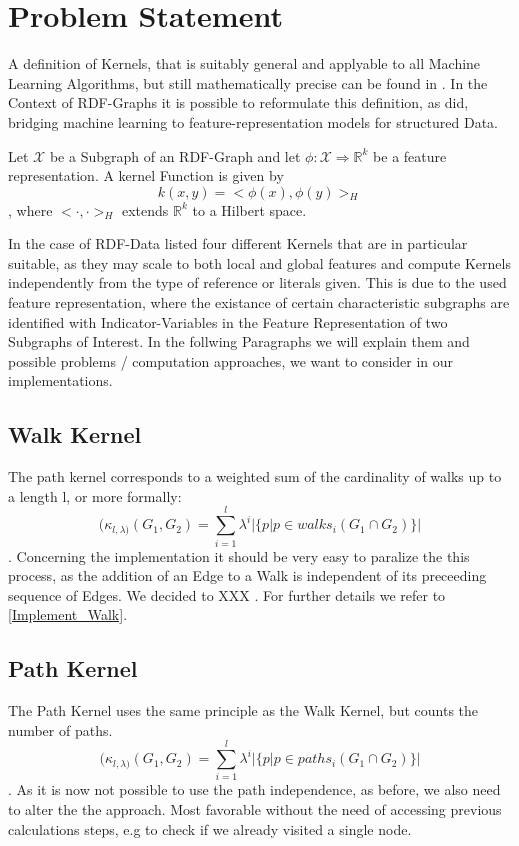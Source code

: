 
\section{Problem Statement}
A definition of Kernels, that is suitably general and applyable to all Machine Learning Algorithms, but still mathematically precise can be found in \citep{shawe}. In the Context of RDF-Graphs it is possible to reformulate this definition, as \citet{mainsource} did, bridging machine learning to feature-representation models for structured Data. 

\begin{Definition}
Let $\mathscr{X}$ be a Subgraph of an RDF-Graph and let $\phi: \mathscr{X} \Rightarrow \mathbb{R}^k$ be a feature representation. A kernel Function is given by \[k(x,y) = <\phi(x),\phi(y)>_H\], where $<\cdot,\cdot>_H $  extends $\mathbb{R}^k$ to a Hilbert space.
\end{Definition}

In the case of RDF-Data \citet{mainsource} listed four different Kernels that are in particular suitable, as they may scale to both local and global features and compute Kernels independently from the type of reference or literals given. This is due to the used feature representation, where the existance of certain characteristic subgraphs are identified with Indicator-Variables in the Feature Representation of two Subgraphs of Interest. 
In the follwing Paragraphs we will explain them and possible problems / computation approaches, we want to consider in our implementations.

\subsection{Walk Kernel}
The path kernel corresponds to a weighted sum of the cardinality of walks up to a length l, or more formally:
\[( \kappa_{l,\lambda)}(G_1,G_2)=\sum_{i=1}^l \lambda^i \big|\{p | p \in walks_i(G_1 \cap G_2) \} \big|  \] \cite{mainsource}. 
Concerning the implementation it should be very easy to paralize the this process, as the addition of an Edge to a Walk is independent of its preceeding sequence of Edges. We decided to XXX . For further details we refer to \ref{Implement_Walk}.

\subsection{Path Kernel}
The Path Kernel uses the same principle as the Walk Kernel, but counts the number of paths.
\[( \kappa_{l,\lambda)}(G_1,G_2)=\sum_{i=1}^l \lambda^i \big|\{p | p \in paths_i(G_1 \cap G_2) \} \big|  \] \cite{mainsource}. 
As it is now not possible to use the path independence, as before, we also need to alter the the approach. Most favorable without the need of accessing previous calculations steps, e.g to check if we already visited a single node. 

